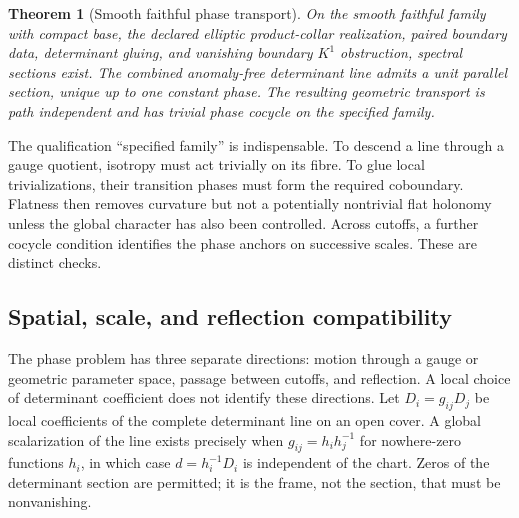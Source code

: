 \documentclass[11pt,a4paper,oneside]{book}
\theoremstyle{plain}
\newtheorem{theorem}{Theorem}[chapter]
\theoremstyle{definition}
\theoremstyle{remark}
\newcommand{\src}[2]{\cite{#1}}
\begin{document}
\begin{theorem}[Smooth faithful phase transport]
\label{thm:smooth-phase}
On the smooth faithful family with compact base, the declared elliptic product-collar realization, paired boundary data, determinant gluing, and vanishing boundary $K^1$ obstruction, spectral sections exist. The combined anomaly-free determinant line admits a unit parallel section, unique up to one constant phase. The resulting geometric transport is path independent and has trivial phase cocycle on the specified family.
\end{theorem}
\src{GT}{thm:SMST-smooth-faithful-phase}

The qualification ``specified family'' is indispensable. To descend a line through a gauge quotient, isotropy must act trivially on its fibre. To glue local trivializations, their transition phases must form the required coboundary. Flatness then removes curvature but not a potentially nontrivial flat holonomy unless the global character has also been controlled. Across cutoffs, a further cocycle condition identifies the phase anchors on successive scales. These are distinct checks.

\subsection{Spatial, scale, and reflection compatibility}
The phase problem has three separate directions: motion through a gauge or
geometric parameter space, passage between cutoffs, and reflection.  A local
choice of determinant coefficient does not identify these directions.  Let
$D_i=g_{ij}D_j$ be local coefficients of the complete determinant line on an
open cover.  A global scalarization of the line exists precisely when
$g_{ij}=h_i h_j^{-1}$ for nowhere-zero functions $h_i$, in which case
$d=h_i^{-1}D_i$ is independent of the chart.  Zeros of the determinant section
are permitted; it is the frame, not the section, that must be nonvanishing.
\src{R10}{thm:v97-scalarization}
\end{document}
